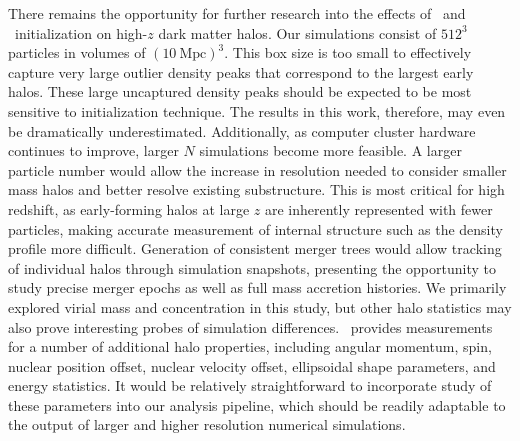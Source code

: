 There remains the opportunity for further research into the effects of \za\ and \lpt\ initialization on high-$z$ dark matter halos.  Our simulations consist of $512^{3}$ particles in volumes of $(10~\mathrm{Mpc})^{3}$.  This box size is too small to effectively capture very large outlier density peaks that correspond to the largest early halos.  These large uncaptured density peaks should be expected to be most sensitive to initialization technique.  The results in this work, therefore, may even be dramatically underestimated.  Additionally, as computer cluster hardware continues to improve, larger $N$ simulations become more feasible.  A larger particle number would allow the increase in resolution needed to consider smaller mass halos and better resolve existing substructure.  This is most critical for high redshift, as early-forming halos at large $z$ are inherently represented with fewer particles, making accurate measurement of internal structure such as the density profile more difficult.  Generation of consistent merger trees would allow tracking of individual halos through simulation snapshots, presenting the opportunity to study precise merger epochs as well as full mass accretion histories.  We primarily explored virial mass and concentration in this study, but other halo statistics may also prove interesting probes of simulation differences.  \rockstar\ provides measurements for a number of additional halo properties, including angular momentum, spin, nuclear position offset, nuclear velocity offset, ellipsoidal shape parameters, and energy statistics.  It would be relatively straightforward to incorporate study of these parameters into our analysis pipeline, which should be readily adaptable to the output of larger and higher resolution numerical simulations.




